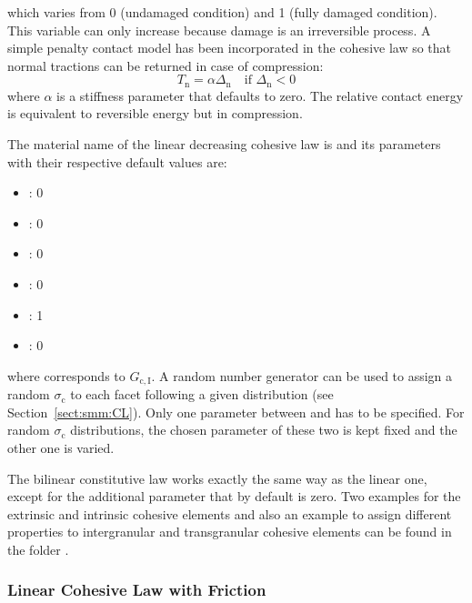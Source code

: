 which varies from 0 (undamaged condition) and 1 (fully
damaged condition). This variable can only increase because damage is
an irreversible process. A simple penalty contact model has been incorporated
in the cohesive law so that normal tractions can be returned in
case of compression:
\begin{equation}
  T_\mathrm{n} = \alpha \Delta_\mathrm{n} \quad\text{if
    $\Delta_\mathrm{n} < 0$}
\end{equation}
where $\alpha$ is a stiffness parameter that defaults to zero. The
relative contact energy is equivalent to reversible energy but in
compression.

The material name of the linear decreasing cohesive law  is
 and its parameters with their
respective default values are:
\begin{itemize}
\item {}: 0
\item {}: 0
\item {}: 0
\item {}: 0
\item {}: 1
\item {}: 0
\end{itemize}
where  corresponds to $G_\mathrm{c, I}$. A random number
generator can be used to assign a random $\sigma_\mathrm{c}$ to each
facet following a given distribution (see
Section~\ref{sect:smm:CL}). Only one parameter between 
and  has to be specified. For random $\sigma_\mathrm{c}$
distributions, the chosen parameter of these two is kept fixed and the
other one is varied.

The bilinear constitutive law works exactly the same way as the linear
one, except for the additional parameter  that by
default is zero. Two examples for the extrinsic and intrinsic cohesive
elements and also an example to assign different properties to
intergranular and transgranular cohesive elements can be found in
the folder .


\subsubsection{Linear Cohesive Law with Friction}

